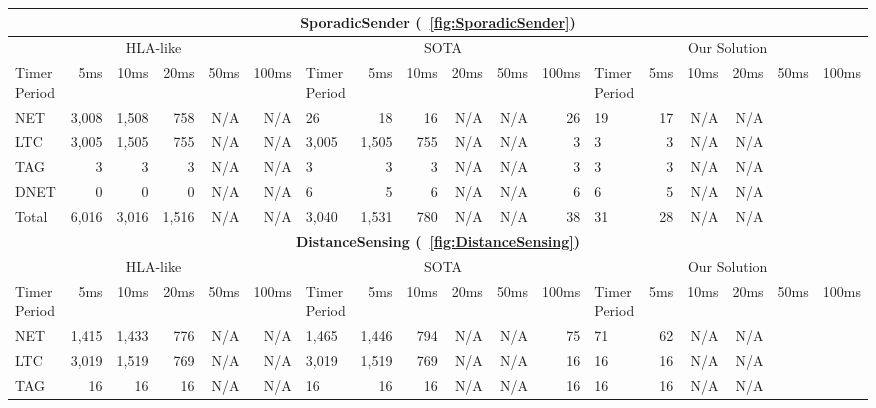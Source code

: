 \begin{table*}
\scriptsize
	\centering
	\begin{tabular}{|l|rrrrr||l|rrrrr||l|rrrrr|}
		\hline
		\multicolumn{18}{|c|}{\textbf{SporadicSender (\figurename~\ref{fig:SporadicSender})}} \\
		\hline
		\multicolumn{6}{|c||}{HLA-like} & \multicolumn{6}{|c||}{SOTA} & \multicolumn{6}{|c|}{Our Solution} \\
		\hline
		Timer Period \hspace{-5pt} & 5ms & 10ms & 20ms & 50ms & 100ms & Timer Period \hspace{-5pt} & 5ms & 10ms & 20ms & 50ms & 100ms & Timer Period \hspace{-5pt} & 5ms & 10ms & 20ms & 50ms & 100ms \\
		\hline
		NET & 3,008 & 1,508 & 758 & N/A & N/A & 26 & 18 & 16 & N/A & N/A & 26 & 19 & 17 & N/A & N/A \\
		LTC & 3,005 & 1,505 & 755 & N/A & N/A & 3,005 & 1,505 & 755 & N/A & N/A & 3 & 3 & 3 & N/A & N/A \\
		TAG & 3 & 3 & 3 & N/A & N/A & 3 & 3 & 3 & N/A & N/A & 3 & 3 & 3 & N/A & N/A \\
		DNET & 0 & 0 & 0 & N/A & N/A & 6 & 5 & 6 & N/A & N/A & 6 & 6 & 5 & N/A & N/A \\
		Total & 6,016 & 3,016 & 1,516 & N/A & N/A & 3,040 & 1,531 & 780 & N/A & N/A & 38 & 31 & 28 & N/A & N/A \\
		\hline
%
		\hline
		\hline
		\multicolumn{18}{|c|}{\textbf{DistanceSensing (\figurename~\ref{fig:DistanceSensing})}} \\
		\hline
		\multicolumn{6}{|c||}{HLA-like} & \multicolumn{6}{|c||}{SOTA} & \multicolumn{6}{|c|}{Our Solution} \\
		\hline
		Timer Period \hspace{-5pt} & 5ms & 10ms & 20ms & 50ms & 100ms & Timer Period \hspace{-5pt} & 5ms & 10ms & 20ms & 50ms & 100ms & Timer Period \hspace{-5pt} & 5ms & 10ms & 20ms & 50ms & 100ms \\
		\hline
		NET & 1,415 & 1,433 & 776 & N/A & N/A & 1,465 & 1,446 & 794 & N/A & N/A & 75 & 71 & 62 & N/A & N/A \\
		LTC & 3,019 & 1,519 & 769 & N/A & N/A & 3,019 & 1,519 & 769 & N/A & N/A & 16 & 16 & 16 & N/A & N/A \\
		TAG & 16 & 16 & 16 & N/A & N/A & 16 & 16 & 16 & N/A & N/A & 16 & 16 & 16 & N/A & N/A \\

\end{tabular}
\end{table*}
